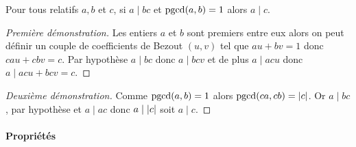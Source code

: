\begin{theo}
  Pour tous relatifs $a,b$ et $c$, si $a \mid bc$ et $\operatorname{pgcd}(a,b)=1$ alors $a \mid c$.
\end{theo}
\begin{proof}[Première démonstration]
  Les entiers $a$ et $b$ sont premiers entre eux alors on peut définir un couple de coefficients de Bezout $(u,v)$ tel que $au+bv=1$ donc $cau+cbv=c$. Par hypothèse $a \mid bc$ donc $a \mid bcv$ et de plus $a \mid acu$ donc $a \mid acu+bcv =c$.
\end{proof}
\begin{proof}[Deuxième démonstration]
 Comme $\operatorname{pgcd}(a,b)=1$ alors $\operatorname{pgcd}(ca,cb)=\left\lvert c\right\rvert$. Or $a \mid bc$, par hypothèse et $a \mid ac$ donc $a \mid \left\lvert c\right\rvert$ soit $a \mid c$.
\end{proof}

\paragraph{Propriétés}

